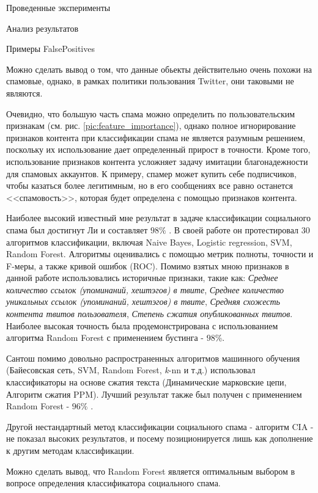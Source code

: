 \begin{section}{Проведенные эксперименты}
\begin{subsection}{Анализ результатов}
\begin{table}[H]
\caption{Примеры FalsePositives}
\label{tab:fp2}
\end{table}


Можно сделать вывод о том, что данные обьекты действительно очень похожи на спамовые, однако, в рамках политики пользования Twitter, они таковыми не являются.

Очевидно, что большую часть спама можно определить по пользовательским признакам (см. рис. \ref{pic:feature_importance}), однако полное игнорирование признаков контента при классификации спама не является разумным решением, поскольку их использование дает определенный прирост в точности. Кроме того, использование признаков контента усложняет задачу имитации благонадежности для спамовых аккаунтов. К примеру, спамер может купить себе подписчиков, чтобы казаться более легитимным, но в его сообщениях все равно останется <<спамовость>>, которая будет определена с помощью признаков контента.

Наиболее высокий известный мне результат в задаче классификации социального спама был достигнут Ли \cite{Lee} и составляет $98\%$ . В своей работе он протестировал 30 алгоритмов классификации, включая Naive Bayes, Logistic regression, SVM, Random Forest. Алгоритмы оценивались с помощью метрик полноты, точности и F-меры, а также кривой ошибок (ROC).  Помимо взятых мною признаков в данной работе использовались историчные признаки, такие как: \textit{Среднее количество ссылок (упоминаний, хештэгов) в твите},  \textit{Среднее количество  уникальных ссылок (упоминаний, хештэгов) в твите}, \textit{Средняя схожесть контента твитов пользователя}, \textit{Степень сжатия опубликованных твитов}. Наиболее высокая точность была продемонстрирована с использованием алгоритма Random Forest с применением бустинга - $98$\%.

Сантош помимо довольно распространенных алгоритмов машинного обучения (Байесовская сеть, SVM, Random Forest, \textit{k}-nn и т.д.) использовал классификаторы на основе сжатия текста (Динамические марковские цепи, Алгоритм сжатия PPM). Лучший результат также был получен с применением Random Forest - $96\%$ \cite{Santos}.

Другой нестандартный метод классификации социального спама -  алгоритм CIA \cite{Chao} - не показал высоких результатов, и посему позиционируется лишь как дополнение к другим методам классификации.

Можно сделать вывод, что Random Forest является оптимальным выбором в вопросе определения классификатора социального спама.

\end{subsection}









\end{section}
